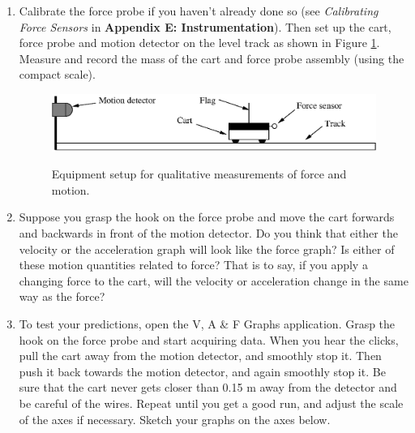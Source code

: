 \begin{enumerate}

\item Calibrate the force probe if you haven't already done so (see \textit{Calibrating Force Sensors} 
in \textbf{Appendix E: Instrumentation}). 
Then set up the cart, force probe and motion detector on the level track as shown in Figure \ref{forcefig1}. 
Measure and record the mass of the cart and force probe assembly (using the compact scale).

\vspace{10mm}

\begin{figure}[hbt]
\begin{center}
{\includegraphics{iqsForce/force1_fig1b.eps}}
\caption{Equipment setup for qualitative measurements of force and motion.}\label{forcefig1}
\end{center}
\end{figure}


\item Suppose you grasp the hook on the force probe and move the cart forwards
and backwards in front of the motion detector. Do you think that either the
velocity or the acceleration graph will look like the force graph? Is either
of these motion quantities related to force? That is to say, if you apply a
changing force to the cart, will the velocity or acceleration change in the
same way as the force?
\vspace{30mm}

\item To test your predictions, open the V, A \& F Graphs application. Grasp the
hook on the force probe and start acquiring data. When you hear the clicks,
pull the cart away from the motion detector, and smoothly stop it. Then push
it back towards the motion detector, and again smoothly stop it. Be sure that
the cart never gets closer than 0.15 m away from the detector and be careful
of the wires. Repeat until you get a good run, and adjust 
the scale of the axes if necessary. Sketch your graphs on the axes below.


\end{enumerate}
